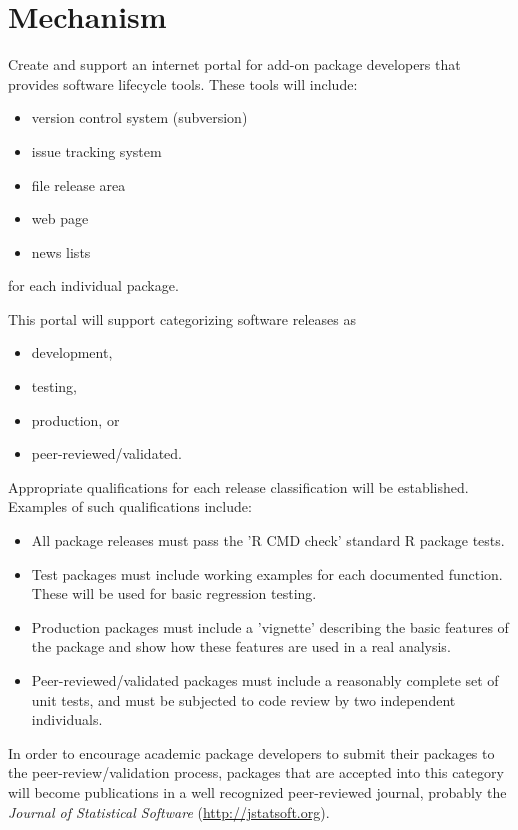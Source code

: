\documentclass[12pt]{article}
\begin{document}
\section{Mechanism}

Create and support an internet portal for add-on package developers
that provides software lifecycle tools.  These tools will include:
\begin{itemize}
\item version control system (subversion)
\item issue tracking system
\item file release area
\item web page
\item news lists
\end{itemize} for each individual package.

This portal will support categorizing software releases as
\begin{itemize}
\item development,
\item testing,
\item production, or
\item peer-reviewed/validated.
\end{itemize}

Appropriate qualifications for each release classification will be
established.  Examples of such qualifications include:
\begin{itemize}
\item All package releases must pass the 'R CMD check'
  standard R package tests.
\item Test packages must include working examples for each documented
  function.  These will be used for basic regression testing.
\item Production packages must include a 'vignette' describing the
  basic features of the package and show how these features are used
  in a real analysis.
\item Peer-reviewed/validated packages must include a reasonably
  complete set of unit tests, and must be subjected to code review by
  two independent individuals.
\end{itemize}

In order to encourage academic package developers to submit their
packages to the peer-review/validation process, packages that are
accepted into this category will become publications in a well
recognized peer-reviewed journal, probably the \emph{Journal of
Statistical Software} (\url{http://jstatsoft.org}).
\end{document}
